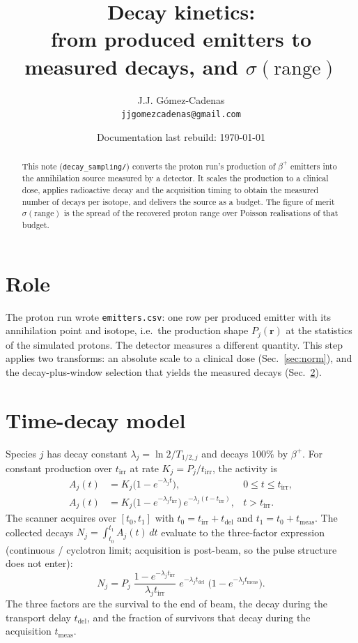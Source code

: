 \documentclass[11pt]{article}
\title{Decay kinetics:\\
from produced emitters to measured decays, and $\sigma(\text{range})$}
\author{J.J. G\'omez-Cadenas\\\texttt{jjgomezcadenas@gmail.com}}
\date{Documentation last rebuild: \today}
\newcommand{\tirr}{t_{\mathrm{irr}}}
\newcommand{\tdel}{t_{\mathrm{del}}}
\newcommand{\tmeas}{t_{\mathrm{meas}}}
\begin{document}
\maketitle

\begin{abstract}
This note (\texttt{decay\_sampling/}) converts the proton run's production
of $\beta^{+}$ emitters into the annihilation source measured by a detector. It
scales the production to a clinical dose, applies radioactive decay and the
acquisition timing to obtain the measured number of decays per isotope, and
delivers the source as a budget. The figure of merit $\sigma(\text{range})$ is
the spread of the recovered proton range over Poisson realisations of that
budget.
\end{abstract}

\section{Role}

The proton run wrote \texttt{emitters.csv}: one row per produced emitter with its
annihilation point and isotope, i.e.\ the production shape $P_j(\mathbf r)$ at
the statistics of the simulated protons. The detector measures a different
quantity. This step applies two transforms: an absolute scale to a clinical
dose (Sec.~\ref{sec:norm}), and the decay-plus-window selection that yields the
measured decays (Sec.~\ref{sec:decay}).

\section{Time-decay model}
\label{sec:decay}

Species $j$ has decay constant $\lambda_j=\ln2/T_{1/2,j}$ and decays $100\%$ by
$\beta^{+}$. For constant production over $\tirr$ at rate $K_j=P_j/\tirr$, the
activity is
\begin{align}
A_j(t) &= K_j\bigl(1-e^{-\lambda_j t}\bigr), & 0\le t\le \tirr,\\
A_j(t) &= K_j\bigl(1-e^{-\lambda_j \tirr}\bigr)\,e^{-\lambda_j (t-\tirr)},
       & t>\tirr.
\end{align}
The scanner acquires over $[t_0,t_1]$ with $t_0=\tirr+\tdel$ and
$t_1=t_0+\tmeas$. The collected decays $N_j=\int_{t_0}^{t_1}A_j(t)\,dt$ evaluate
to the three-factor expression (continuous / cyclotron limit; acquisition is
post-beam, so the pulse structure does not enter):
\begin{equation}
N_j = P_j\;
\frac{1-e^{-\lambda_j \tirr}}{\lambda_j \tirr}\;
e^{-\lambda_j \tdel}\;
\bigl(1-e^{-\lambda_j \tmeas}\bigr).
\label{eq:nmeas}
\end{equation}
The three factors are the survival to the end of beam, the decay during the
transport delay $\tdel$, and the fraction of survivors that decay during the
acquisition $\tmeas$.
\end{document}
